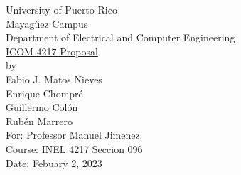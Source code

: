 \begin{titlepage}
  \begin{center}
    \large{University of Puerto Rico\\
    Mayagüez Campus\\
    \vspace{\baselineskip}
    Department of Electrical and Computer Engineering\\}
    \vspace{6cm}
    \Huge{\underline{ICOM 4217 Proposal}\\}
    \large by\\
    Fabio J. Matos Nieves\\
    Enrique Chompré\\
    Guillermo Colón\\
    Rubén Marrero\\
    \vspace{4.5cm}
    For: Professor Manuel Jimenez\\
    Course: INEL 4217 Seccion 096\\
    Date: Febuary 2, 2023\\

  \end{center}
\end{titlepage}
